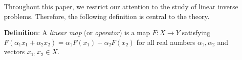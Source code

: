 \documentclass[12pt]{amsart}
\begin{document}
 Throughout this paper, we restrict our attention to the study of linear inverse problems. Therefore, the following definition is central to the theory. 
 
 \textbf{Definition}: A \textit{linear map} (or \textit{operator}) is a map $F: X \to Y$ satisfying $F(\alpha_1x_1 + \alpha_2x_2) = \alpha_1F(x_1) + \alpha_2F(x_2)$ for all real numbers $\alpha_1, \alpha_2$ and vectors $x_1, x_2 \in X$. 
 
 
\end{document}
